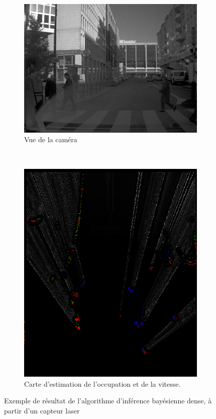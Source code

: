 \begin{figure}[h]
	\begin{center}
		\begin{subfigure}{0.48\textwidth}
			\includegraphics[width=\textwidth]{Chapter5/graphics/crossing_pedestrian_lowfiltering_camera.png} 
			\caption{Vue de la caméra}
		\end{subfigure}	
		~
		\begin{subfigure}{0.48\textwidth}
			\includegraphics[width=\textwidth]{Chapter5/graphics/crossing_pedestrian_lowfiltering_speeds.png} 
			\caption{Carte d'estimation de l'occupation et de la vitesse. }
		\end{subfigure}	
		
		\caption{Exemple de résultat de l'algorithme d'inférence bayésienne dense, à partir d'un capteur laser}
		\label{fig:ch5_bayésien_2D}
	\end{center}
\end{figure}

